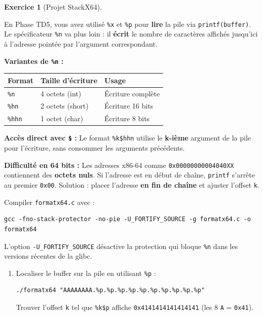 \documentclass[a4paper,11pt]{article}
\theoremstyle{plain}
\theoremstyle{definition}
\newtheorem{exercice}{Exercice}
\begin{document}
\begin{exercice}[Projet StackX64]
\begin{rappel}
En Phase TD5, vous avez utilisé \texttt{\%x} et \texttt{\%p} pour \textbf{lire} la pile via \texttt{printf(buffer)}. Le spécificateur \texttt{\%n} va plus loin : il \textbf{écrit} le nombre de caractères affichés jusqu'ici à l'adresse pointée par l'argument correspondant.

\medskip
\textbf{Variantes de \texttt{\%n} :}
\begin{center}
\begin{tabular}{lll}
\toprule
\textbf{Format} & \textbf{Taille d'écriture} & \textbf{Usage} \\
\midrule
\texttt{\%n} & 4 octets (int) & Écriture complète \\
\texttt{\%hn} & 2 octets (short) & Écriture 16 bits \\
\texttt{\%hhn} & 1 octet (char) & Écriture 8 bits \\
\bottomrule
\end{tabular}
\end{center}

\medskip
\textbf{Accès direct avec \texttt{\$} :} Le format \texttt{\%k\$hhn} utilise le \textbf{k-ième} argument de la pile pour l'écriture, sans consommer les arguments précédents.

\medskip
\textbf{Difficulté en 64 bits :} Les adresses x86-64 comme \texttt{0x00000000004040XX} contiennent des \textbf{octets nuls}. Si l'adresse est en début de chaîne, \texttt{printf} s'arrête au premier \texttt{0x00}. Solution : placer l'adresse \textbf{en fin de chaîne} et ajuster l'offset \texttt{k}.
\end{rappel}

\begin{attention}
Compiler \texttt{formatx64.c} avec :
\begin{lstlisting}[style=GDBStyle]
gcc -fno-stack-protector -no-pie -U_FORTIFY_SOURCE -g formatx64.c -o formatx64
\end{lstlisting}
L'option \texttt{-U\_FORTIFY\_SOURCE} désactive la protection qui bloque \texttt{\%n} dans les versions récentes de la glibc.
\end{attention}

\begin{enumerate}
\item[\textbf{5a)}] Localiser le buffer sur la pile en utilisant \texttt{\%p} :
\begin{lstlisting}[style=GDBStyle]
./formatx64 "AAAAAAAA.%p.%p.%p.%p.%p.%p.%p.%p.%p.%p"
\end{lstlisting}
Trouver l'offset \texttt{k} tel que \texttt{\%k\$p} affiche \texttt{0x4141414141414141} (les 8 \texttt{A} = \texttt{0x41}).


\end{enumerate}
\end{exercice}
\end{document}

